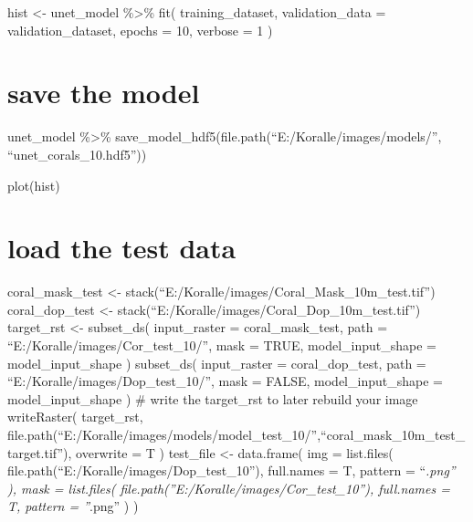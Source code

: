 \documentclass[
]{article}
\begin{document}
{{{{hist \textless- unet\_model \%\textgreater\% fit( training\_dataset,
validation\_data = validation\_dataset, epochs = 10, verbose = 1 )

\hypertarget{save-the-model}{%
\section{save the model}\label{save-the-model}}

unet\_model \%\textgreater\%
save\_model\_hdf5(file.path(``E:/Koralle/images/models/'',
``unet\_corals\_10.hdf5''))

plot(hist)

\hypertarget{load-the-test-data}{%
\section{load the test data}\label{load-the-test-data}}

coral\_mask\_test \textless-
stack(``E:/Koralle/images/Coral\_Mask\_10m\_test.tif'') coral\_dop\_test
\textless- stack(``E:/Koralle/images/Coral\_Dop\_10m\_test.tif'')
target\_rst \textless- subset\_ds( input\_raster = coral\_mask\_test,
path = ``E:/Koralle/images/Cor\_test\_10/'', mask = TRUE,
model\_input\_shape = model\_input\_shape ) subset\_ds( input\_raster =
coral\_dop\_test, path = ``E:/Koralle/images/Dop\_test\_10/'', mask =
FALSE, model\_input\_shape = model\_input\_shape ) \# write the
target\_rst to later rebuild your image writeRaster( target\_rst,
file.path(``E:/Koralle/images/models/model\_test\_10/'',``coral\_mask\_10m\_test\_target.tif''),
overwrite = T ) test\_file \textless- data.frame( img = list.files(
file.path(``E:/Koralle/images/Dop\_test\_10''), full.names = T, pattern
= ``\emph{.png'' ), mask = list.files(
file.path(''E:/Koralle/images/Cor\_test\_10''), full.names = T, pattern
= ''}.png'' ) )

}}}}
\end{document}
